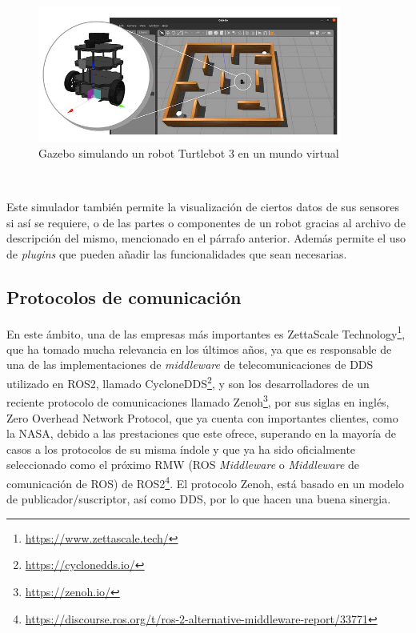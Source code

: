 \begin{figure} [h!]
  \begin{center}
    \includegraphics[width=10cm]{figs/gazebo_sim}
  \end{center}
  \caption{Gazebo simulando un robot Turtlebot 3 en un mundo virtual \citep{gazebo}}
  \label{fig:gazebo_sim}
\end{figure}\

Este simulador también permite la visualización de ciertos datos de sus sensores
si así se requiere, o de las partes o componentes de un robot gracias al archivo
de descripción del mismo, mencionado en el párrafo anterior.
Además permite el uso de \textit{plugins} que pueden añadir las funcionalidades
que sean necesarias.
\\


\subsection{Protocolos de comunicación}
\label{sec:protocolos_comunicacion}

En este ámbito, una de las empresas más importantes es ZettaScale
Technology\footnote{\url{https://www.zettascale.tech/}}, que ha tomado mucha
relevancia en los últimos años, ya que es responsable de una de las
implementaciones de \textit{middleware} de telecomunicaciones de DDS utilizado
en ROS2, llamado CycloneDDS\footnote{\url{https://cyclonedds.io/}}, y son los
desarrolladores de un reciente protocolo de comunicaciones llamado
Zenoh\footnote{\url{https://zenoh.io/}}, por sus siglas en inglés, Zero Overhead
Network Protocol, que ya cuenta con importantes clientes, como la NASA, debido a
las prestaciones que este ofrece, superando en la mayoría de casos a los
protocolos de su misma índole y que ya ha sido oficialmente seleccionado como el
próximo RMW (ROS \textit{Middleware} o \textit{Middleware} de comunicación de
ROS) de ROS2\footnote{
\url{https://discourse.ros.org/t/ros-2-alternative-middleware-report/33771}}.
El protocolo Zenoh, está basado en un modelo de publicador/suscriptor, así como
DDS, por lo que hacen una buena sinergia.
\\

